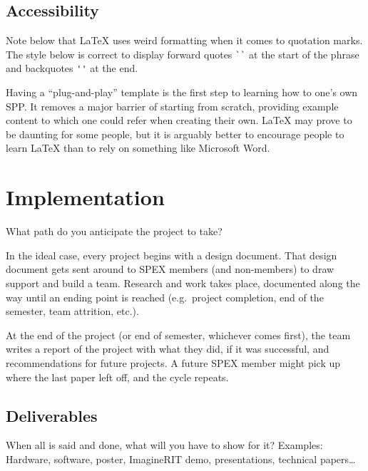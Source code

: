 \documentclass[journal]{SPEXformat}
\newenvironment{help}{
  \ttfamily\footnotesize\sloppy
  \begin{lrbox}{\helpbox}\begin{minipage}{\linewidth}
  }{
  \end{minipage}\end{lrbox}
  \ifbool{showhelp}{
    \fbox{\usebox{\helpbox}}
  }{}
}
\begin{document}
\subsection{Accessibility}
\label{subsec:plug-n-play}
\begin{help}
  Note below that LaTeX uses weird formatting when it comes to quotation marks.
  The style below is correct to display forward quotes \verb|``| at the start of the phrase and backquotes \verb|''| at the end.
\end{help}

Having a ``plug-and-play'' template is the first step to learning how to one's own SPP\@.
It removes a major barrier of starting from scratch, providing example content to which one could refer when creating their own.
\LaTeX{} may prove to be daunting for some people, but it is arguably better to encourage people to learn LaTeX than to rely on something like Microsoft Word.

\section{Implementation}
\label{sec:implementation}
\begin{help}
  What path do you anticipate the project to take?
\end{help}

In the ideal case, every project begins with a design document.
That design document gets sent around to SPEX members (and non-members) to draw support and build a team.
Research and work takes place, documented along the way until  an ending point is reached (e.g.\ project completion, end of the semester, team attrition, etc.).

At the end of the project (or end of semester, whichever comes first), the team writes a report of the project with what they did, if it was successful, and recommendations for future projects.
A future SPEX member might pick up where the last paper left off, and the cycle repeats.

\subsection{Deliverables}
\label{subsec:deliverables}
\begin{help}
  When all is said and done, what will you have to show for it?
  Examples: Hardware, software, poster, ImagineRIT demo, presentations, technical papers\ldots
\end{help}
\end{document}
